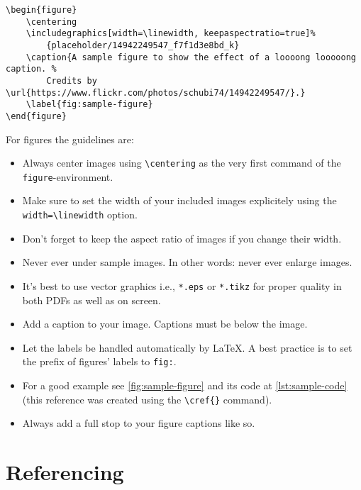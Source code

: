 \documentclass[%
    thesis=ma, %
    language=american, %
    paper=a4,%
    online,
    final,
]{isw}
\begin{document}
    \begin{listing}
        \begin{verbatim}
\begin{figure}
    \centering
    \includegraphics[width=\linewidth, keepaspectratio=true]%
        {placeholder/14942249547_f7f1d3e8bd_k}
    \caption{A sample figure to show the effect of a loooong looooong caption. %
        Credits by \url{https://www.flickr.com/photos/schubi74/14942249547/}.}
    \label{fig:sample-figure}
\end{figure}
        \end{verbatim}
        \caption{Sample code for \cref{fig:sample-figure}}
        \label{lst:sample-code}
    \end{listing}
    
    For figures the guidelines are:
    \begin{itemize}
        \item Always center images using \verb|\centering| as the very first command of the \verb|figure|-environment.
        \item Make sure to set the width of your included images explicitely using the \verb|width=\linewidth| option.
        \item Don't forget to keep the aspect ratio of images if you change their width.
        \item Never ever under sample images. In other words: never ever enlarge images.
        \item It's best to use vector graphics i.e., \verb|*.eps| or \verb|*.tikz| for proper quality in both PDFs as well as on screen.
        \item Add a caption to your image. Captions must be below the image.
        \item Let the labels be handled automatically by \LaTeX. A best practice is to set the prefix of figures' labels to \verb|fig:|.
        \item For a good example see \cref{fig:sample-figure} and its code at \cref{lst:sample-code} (this reference was created using the \verb|\cref{}| command).
        \item Always add a full stop to your figure captions like so.
    \end{itemize}
    
    
    \section{Referencing}
    
\end{document}
